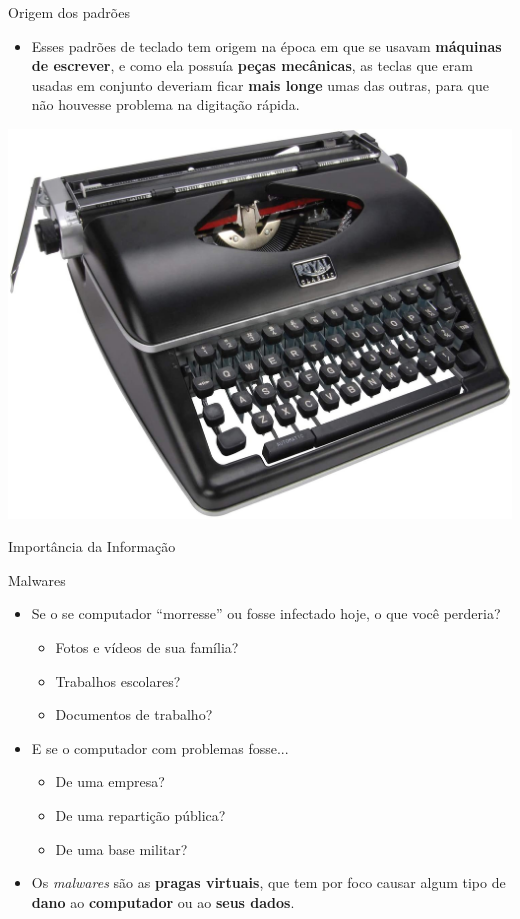 \begin{frame}{Origem dos padrões}
	\begin{block}{}
		\begin{itemize}
			\item Esses padrões de teclado tem origem na época em que se usavam \textbf{máquinas de escrever}, e como ela possuía \textbf{peças mecânicas}, as teclas que eram usadas em conjunto deveriam ficar \textbf{mais longe} umas das outras, para que não houvesse problema na digitação rápida.
		\end{itemize}
	\end{block}

	\centering
	\includegraphics[width=0.6\linewidth]{Figuras/Ch02/fig19.2}
\end{frame}


\begin{frame}{Importância da Informação}
	\begin{block}{Malwares}
		\begin{itemize}
			\item Se o se computador “morresse” ou fosse infectado hoje, o que você perderia?
			      \begin{itemize}
				      \item\normalsize Fotos e vídeos de sua família?
				      \item\normalsize Trabalhos escolares?
				      \item\normalsize Documentos de trabalho?
			      \end{itemize}
			\item E se o computador com problemas fosse...
			      \begin{itemize}
				      \item\normalsize De uma empresa?
				      \item\normalsize De uma repartição pública?
				      \item\normalsize De uma base militar?
			      \end{itemize}
			\item Os \textit{malwares} são as \textbf{pragas virtuais}, que tem por foco causar algum tipo de \textbf{dano} ao \textbf{computador} ou ao \textbf{seus dados}.
		\end{itemize}
	\end{block}
\end{frame}


